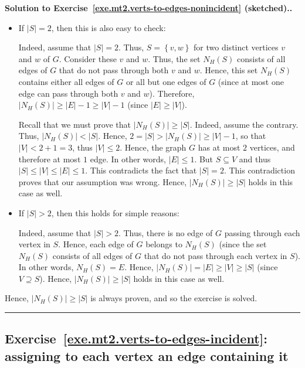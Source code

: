 \documentclass[numbers=enddot,12pt,final,onecolumn,notitlepage]{scrartcl}%
\newcounter{exer}
\theoremstyle{definition}
\newenvironment{proof}[1][Proof]{\noindent\textbf{#1.} }{\ \rule{0.5em}{0.5em}}
\newcommand{\set}[1]{\left\{ #1 \right\}}
\newcommand{\abs}[1]{\left| #1 \right|}
\newcommand{\tup}[1]{\left( #1 \right)}
\begin{document}
\begin{proof}[Solution to
Exercise~\ref{exe.mt2.verts-to-edges-nonincident} (sketched).]
\begin{itemize}
\item If $\abs{S} = 2$, then this is also easy to check: \par
      Indeed, assume that $\abs{S} = 2$.
      Thus, $S = \set{v, w}$ for two distinct vertices $v$ and $w$ of
      $G$.
      Consider these $v$ and $w$.
      Thus, the set $N_H \tup{S}$ consists of all edges of $G$ that
      do not pass through both $v$ and $w$.
      Hence, this set $N_H \tup{S}$ contains either all edges of $G$
      or all but one edges of $G$ (since at most one edge can
      pass through both $v$ and $w$).
      Therefore, $\abs{N_H \tup{S}} \geq \abs{E} - 1 \geq \abs{V} - 1$
      (since $\abs{E} \geq \abs{V}$). \par
      Recall that we must prove that $\abs{N_H\tup{S}} \geq \abs{S}$.
      Indeed, assume the contrary.
      Thus, $\abs{N_H\tup{S}} < \abs{S}$.
      Hence, $2 = \abs{S} > \abs{N_H\tup{S}} \geq \abs{V} - 1$, so
      that $\abs{V} < 2 + 1 = 3$, thus $\abs{V} \leq 2$.
      Hence, the graph $G$ has at most $2$ vertices, and therefore at
      most $1$ edge.
      In other words, $\abs{E} \leq 1$.
      But $S \subseteq V$ and thus
      $\abs{S} \leq \abs{V} \leq \abs{E} \leq 1$.
      This contradicts the fact that $\abs{S} = 2$.
      This contradiction proves that our assumption was wrong.
      Hence, $\abs{N_H\tup{S}} \geq \abs{S}$ holds in this case as
      well.

\item If $\abs{S} > 2$, then this holds for simple reasons: \par
      Indeed, assume that $\abs{S} > 2$.
      Thus, there is no edge of $G$ passing through each vertex in
      $S$.
      Hence, each edge of $G$ belongs to $N_H \tup{S}$ (since the set
      $N_H \tup{S}$ consists of all edges of $G$ that do not pass
      through each vertex in $S$).
      In other words, $N_H \tup{S} = E$.
      Hence, $\abs{N_H \tup{S}} = \abs{E} \geq \abs{V} \geq \abs{S}$
      (since $V \supseteq S$).
      Hence, $\abs{N_H\tup{S}} \geq \abs{S}$ holds in this case as
      well.

\end{itemize}

Hence, $\abs{N_H\tup{S}} \geq \abs{S}$ is always proven, and so
the exercise is solved.
\end{proof}

\subsection{Exercise~\ref{exe.mt2.verts-to-edges-incident}:
assigning to each vertex an edge containing it}
\end{document}
